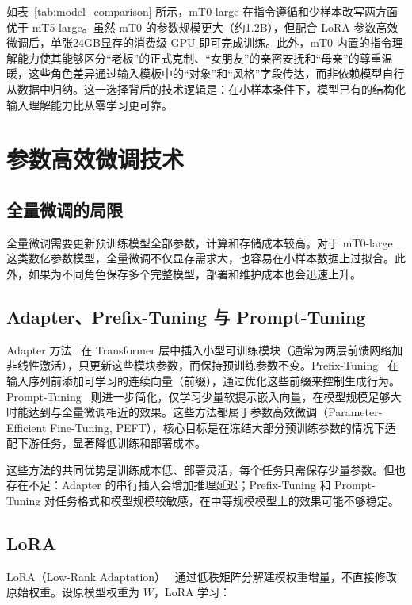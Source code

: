 \documentclass[12pt,a4paper]{ctexart}
\begin{document}
如表~\ref{tab:model_comparison} 所示，mT0-large 在指令遵循和少样本改写两方面优于 mT5-large。虽然 mT0 的参数规模更大（约1.2B），但配合 LoRA 参数高效微调后，单张24GB显存的消费级 GPU 即可完成训练。此外，mT0 内置的指令理解能力使其能够区分“老板”的正式克制、“女朋友”的亲密安抚和“母亲”的尊重温暖，这些角色差异通过输入模板中的“对象”和“风格”字段传达，而非依赖模型自行从数据中归纳。这一选择背后的技术逻辑是：在小样本条件下，模型已有的结构化输入理解能力比从零学习更可靠。

\section{参数高效微调技术}

\subsection{全量微调的局限}

全量微调需要更新预训练模型全部参数，计算和存储成本较高。对于 mT0-large 这类数亿参数模型，全量微调不仅显存需求大，也容易在小样本数据上过拟合。此外，如果为不同角色保存多个完整模型，部署和维护成本也会迅速上升。

\subsection{Adapter、Prefix-Tuning 与 Prompt-Tuning}

Adapter 方法~\cite{houlsby2019} 在 Transformer 层中插入小型可训练模块（通常为两层前馈网络加非线性激活），只更新这些模块参数，而保持预训练参数不变。Prefix-Tuning~\cite{li2021prefix} 在输入序列前添加可学习的连续向量（前缀），通过优化这些前缀来控制生成行为。Prompt-Tuning~\cite{lester2021} 则进一步简化，仅学习少量软提示嵌入向量，在模型规模足够大时能达到与全量微调相近的效果。这些方法都属于参数高效微调（Parameter-Efficient Fine-Tuning, PEFT），核心目标是在冻结大部分预训练参数的情况下适配下游任务，显著降低训练和部署成本。

这些方法的共同优势是训练成本低、部署灵活，每个任务只需保存少量参数。但也存在不足：Adapter 的串行插入会增加推理延迟；Prefix-Tuning 和 Prompt-Tuning 对任务格式和模型规模较敏感，在中等规模模型上的效果可能不够稳定。

\subsection{LoRA}

LoRA（Low-Rank Adaptation）~\cite{hu2022lora} 通过低秩矩阵分解建模权重增量，不直接修改原始权重。设原模型权重为 $W$，LoRA 学习：
\end{document}
